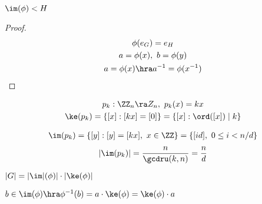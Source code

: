 \begin{proposition}
  $\im(\phi) < H$
\end{proposition}

\begin{proof}
  \begin{gather}
    \phi(e_G) = e_H \\
    a = \phi(x), \ b = \phi(y) \\
    a = \phi(x) \hra a^{-1} = \phi(x^{-1}) \\
  \end{gather}
\end{proof}

\begin{example}
  \begin{gather}
    p_k : \ZZ_n \ra Z_n, \ p_k(x) = kx \\
    \ke (p_k) = \{ [x] : [kx] = [0]\} = \{ [x] : \ord([x]) \mid k \}
  \end{gather}
\end{example}

\begin{example}
  \begin{gather}
    \im (p_k) = \{ [y] : [y] = [kx], \ x \in \ZZ \} = \{ [id], \  0 \leq i < n / d\} \\
  \end{gather}
  \[| \im(p_k) | = \frac{n}{\gcdru(k, n)} = \frac{n}{d}\]
\end{example}

\begin{theorem}
  $|G| = |\im |(\phi)| \cdot |\ke (\phi)|$
\end{theorem}

\begin{lemma}
  $b \in \im (\phi) \hra \phi^{-1}(b) = a \cdot \ke (\phi) = \ke (\phi) \cdot a$
\end{lemma}

